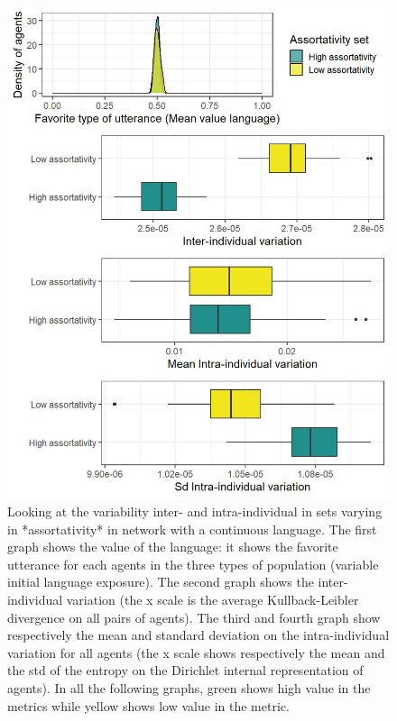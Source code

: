 \documentclass[
]{article}
\begin{document}
\begin{figure}[!H]

{\centering \includegraphics{./Figures/unnamed-chunk-44-1} 

}

\caption{Looking at the variability inter- and intra-individual in sets varying in *assortativity* in network with a continuous language. The first graph shows the value of the language: it shows the favorite utterance for each agents in the three types of population (variable initial language exposure). The second graph shows the  inter-individual variation (the x scale is the average Kullback-Leibler divergence on all pairs of agents). The third and fourth graph show respectively the mean and standard deviation on the intra-individual variation for all agents (the x scale shows respectively the mean and the std of the entropy on the Dirichlet internal representation of agents). In all the following graphs, green shows high value in the metrics while yellow shows low value in the metric.}\label{fig:unnamed-chunk-44}
\end{figure}
\end{document}
